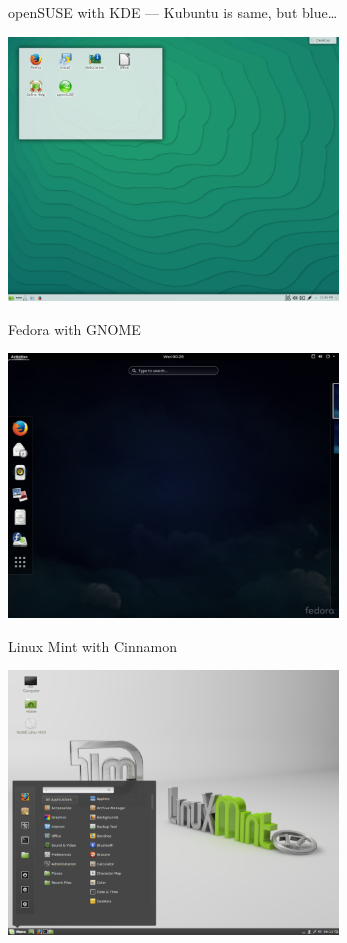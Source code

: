 \documentclass[hyperref={bookmarks=true, unicode=true, colorlinks=true, pdftitle={Linux, command line and MetaCentrum}, plainpages=false, pdfauthor={Vojtech Zeisek}, pdfsubject={Course about use of Linux command line, writing shell scripts and using MetaCentrum of CESNET}, pdfcreator={XeLaTeX, http://www.xelatex.org/}, pdfkeywords={Linux, GNU, BASH, shell, command line, MetaCentrum}, linkcolor=Sienna, anchorcolor=black, citecolor=green, filecolor=magenta, menucolor=Sienna, urlcolor=cyan, pdftex}, compress, ucs, xelatex, xcolor=svgnames, 11pt]{beamer}
\begin{document}
\begin{frame}{openSUSE with KDE --- Kubuntu is same, but blue\ldots}
\begin{center}
  \includegraphics[height=7cm]{opensuse.png}
\end{center}
\end{frame}

\begin{frame}{Fedora with GNOME}
\begin{center}
  \includegraphics[height=7cm]{fedora.png}
\end{center}
\end{frame}

\begin{frame}{Linux Mint with Cinnamon}
\begin{center}
  \includegraphics[height=7cm]{mint.png}
\end{center}
\end{frame}
\end{document}
